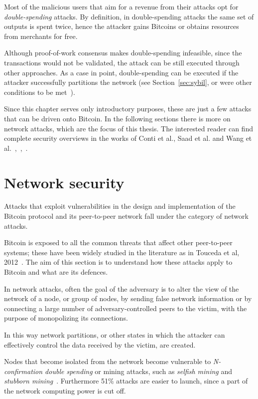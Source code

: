 Most of the malicious users that aim for a revenue from their attacks opt for \textit{double-spending} attacks. By definition, in double-spending attacks the same set of outputs is spent twice, hence the attacker gains Bitcoins or obtains resources from merchants for free.

Although proof-of-work consensus makes double-spending infeasible, since the transactions would not be validated, the attack can be still executed through other approaches. As a case in point, double-spending can be executed if the attacker successfully partitions the network (see Section~\ref{sec:sybil}, or were other conditions to be met~\cite{doublespendfastpay}).\par

Since this chapter serves only introductory purposes, these are just a few attacks that can be driven onto Bitcoin. In the following sections there is more on network attacks, which are the focus of this thesis. The interested reader can find complete security overviews in the works of Conti et al., Saad et al. and Wang et al.~\cite{contiatksurvey},~\cite{saad2019attacksurface},~\cite{secpermissionlessblock}.

\section{Network security}\label{sec:netsec}
Attacks that exploit vulnerabilities in the design and implementation of the Bitcoin protocol and its peer-to-peer network fall under the category of network attacks.

Bitcoin is exposed to all the common threats that affect other peer-to-peer systems; these have been widely studied in the literature as in Touceda et al, 2012~\cite{toucedafakeboot}. The aim of this section is to understand how these attacks apply to Bitcoin and what are its defences.\par

In network attacks, often the goal of the adversary is to alter the view of the network of a node, or group of nodes, by sending false network information or by connecting a large number of adversary-controlled peers to the victim, with the purpose of monopolizing its connections.

In this way network partitions, or other states in which the attacker can effectively control the data received by the victim, are created.

Nodes that become isolated from the network become vulnerable to \textit{N-confirmation double spending} or mining attacks, such as \textit{selfish mining} and \textit{stubborn mining}~\cite{stubborn}. Furthermore 51\% attacks are easier to launch, since a part of the network computing power is cut off. 

